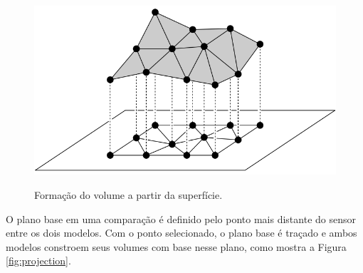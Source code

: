 \begin{figure}[H]
    \centering
    \caption{Formação do volume a partir da superfície.}
    \includegraphics[scale=0.5]{dados/figuras/prisms.png}
    \label{fig:prism}
\end{figure}

O plano base em uma comparação é definido pelo ponto mais distante do sensor entre os dois modelos.
Com o ponto selecionado, o plano base é traçado e ambos modelos constroem seus volumes com base nesse plano, como mostra a Figura \ref{fig:projection}.

